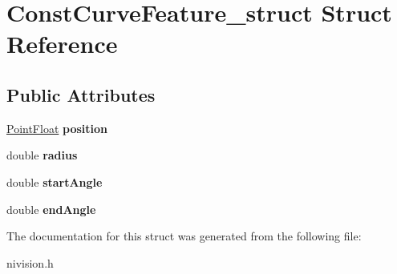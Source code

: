 \hypertarget{structConstCurveFeature__struct}{\section{\-Const\-Curve\-Feature\-\_\-struct \-Struct \-Reference}
\label{structConstCurveFeature__struct}
}
\subsection*{\-Public \-Attributes}
\begin{DoxyCompactItemize}
\item 
\hypertarget{structConstCurveFeature__struct_a78138aa92ee34f814c02c7ed732a8c4a}{\hyperlink{structPointFloat__struct}{\-Point\-Float} {\bfseries position}}\label{structConstCurveFeature__struct_a78138aa92ee34f814c02c7ed732a8c4a}

\item 
\hypertarget{structConstCurveFeature__struct_afde7bb7b3de40daa79168a6b4f25da07}{double {\bfseries radius}}\label{structConstCurveFeature__struct_afde7bb7b3de40daa79168a6b4f25da07}

\item 
\hypertarget{structConstCurveFeature__struct_a28b49bf0346faf524c6e900c1fbab853}{double {\bfseries start\-Angle}}\label{structConstCurveFeature__struct_a28b49bf0346faf524c6e900c1fbab853}

\item 
\hypertarget{structConstCurveFeature__struct_a886fa0c7ca20766d5a3870b56874afe4}{double {\bfseries end\-Angle}}\label{structConstCurveFeature__struct_a886fa0c7ca20766d5a3870b56874afe4}

\end{DoxyCompactItemize}


\-The documentation for this struct was generated from the following file\-:\begin{DoxyCompactItemize}
\item 
nivision.\-h\end{DoxyCompactItemize}
